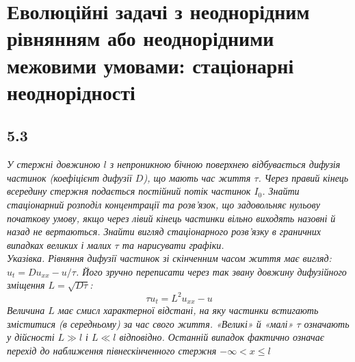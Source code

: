 \documentclass[a4paper, 14pt]{extreport}
\begin{document}
\chapter{Еволюційні задачі з неоднорідним рівнянням або неоднорідними межовими умовами: стаціонарні неоднорідності}

\section[Задача №5.3]{5.3}

\textit{У стержні довжиною $l$ з непроникною бічною поверхнею відбувається дифузія частинок (коефіцієнт дифузії $D$), що мають час життя $\tau$. Через правий кінець всередину стержня подається постійний потік частинок $I_0$. Знайти стаціонарний розподіл концентрації та розв’язок, що задовольняє нульову початкову умову, якщо через лівий кінець частинки вільно виходять назовні й назад не вертаються. Знайти вигляд стаціонарного розв’язку в граничних випадках великих і малих $\tau$ та нарисувати графіки.\\
Указівка. Рівняння дифузії частинок зі скінченним часом життя має вигляд:
$u_t = D u_{xx} - u/\tau$. Його зручно переписати через так звану
довжину дифузійного зміщення $L = \sqrt{D\tau}$: \[\tau u_t = L^2 u_{xx} - u\] Величина $L$ має смисл характерної відстані, на яку частинки встигають зміститися (в середньому) за час свого життя. «Великі» й «малі» $\tau$ означають у дійсності $L \gg l$ і $L \ll l$ відповідно. Останній випадок фактично означає перехід до наближення півнескінченного стержня $-\infty < x \leq l$}
\end{document}
